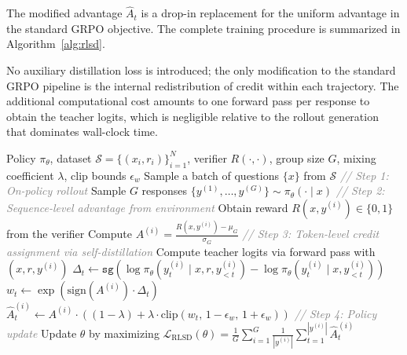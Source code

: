 \documentclass[]{jingdong}
\begin{document}
The modified advantage $\hat{A}_t$ is a drop-in replacement for the uniform advantage in the standard GRPO objective. The complete training procedure is summarized in Algorithm~\ref{alg:rlsd}.



No auxiliary distillation loss is introduced; the only modification to the standard GRPO pipeline is the internal redistribution of credit within each trajectory. The additional computational cost amounts to one forward pass per response to obtain the teacher logits, which is negligible relative to the rollout generation that dominates wall-clock time.




\begin{algorithm}[t]
\caption{RLSD: Reinforcement Learning with Self-Distillation}
\label{alg:rlsd}
\begin{algorithmic}[1]
\Require Policy $\pi_\theta$, dataset $\mathcal{S} = \{(x_i, r_i)\}_{i=1}^N$, verifier $R(\cdot, \cdot)$, group size $G$, mixing coefficient $\lambda$, clip bounds $\epsilon_w$
    \State Sample a batch of questions $\{x\}$ from $\mathcal{S}$
        \State \textcolor{gray}{\textit{// Step 1: On-policy rollout}}
        \State Sample $G$ responses $\{y^{(1)}, \dots, y^{(G)}\} \sim \pi_\theta(\cdot \mid x)$
        \State \textcolor{gray}{\textit{// Step 2: Sequence-level advantage from environment}}
            \State Obtain reward $R(x, y^{(i)}) \in \{0, 1\}$ from the verifier
        \EndFor
        \State Compute $A^{(i)} = \frac{R(x, y^{(i)}) - \mu_G}{\sigma_G}$ 
        \State \textcolor{gray}{\textit{// Step 3: Token-level credit assignment via self-distillation}}
            \State Compute teacher logits via forward pass with $(x, r, y^{(i)})$ 
                \State $\Delta_t \gets \texttt{sg}\!\left(\log \pi_\theta(y_t^{(i)} \mid x, r, y_{<t}^{(i)}) - \log \pi_\theta(y_t^{(i)} \mid x, y_{<t}^{(i)})\right)$ 
                \State $w_t \gets \exp\!\left(\text{sign}(A^{(i)}) \cdot \Delta_t\right)$ 
                \State $\hat{A}_t^{(i)} \gets A^{(i)} \cdot \left((1 - \lambda) + \lambda \cdot \text{clip}(w_t,\, 1 - \epsilon_w,\, 1 + \epsilon_w)\right)$ 
            \EndFor
        \EndFor
    \EndFor
    \State \textcolor{gray}{\textit{// Step 4: Policy update}}
    \State Update $\theta$ by maximizing $\mathcal{L}_{\text{RLSD}}(\theta) = \frac{1}{G} \sum_{i=1}^{G} \frac{1}{|y^{(i)}|} \sum_{t=1}^{|y^{(i)}|} \hat{A}_t^{(i)}$
\EndFor
\end{algorithmic}
\end{algorithm}
\end{document}
